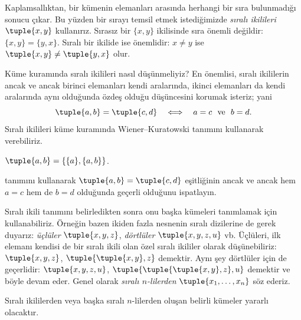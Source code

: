 


\begin{explain}
Kaplamsallıktan, bir kümenin elemanları arasında herhangi bir sıra bulunmadığı
sonucu çıkar. Bu yüzden bir sırayı temsil etmek istediğimizde \emph{sıralı
ikilileri} $\tuple{x, y}$ kullanırız. Sırasız bir $\{x, y\}$ ikilisinde sıra
önemli değildir: $\{x, y\} = \{y, x\}$. Sıralı bir ikilide ise önemlidir:
$x \neq y$ ise $\tuple{x, y} \neq \tuple{y, x}$ olur.

Küme kuramında sıralı ikilileri nasıl düşünmeliyiz? En önemlisi, sıralı
ikililerin ancak ve ancak birinci elemanları kendi aralarında, ikinci
elemanları da kendi aralarında aynı olduğunda özdeş olduğu düşüncesini korumak
isteriz; yani
\[
  \tuple{a, b}= \tuple{c, d}\quad\Longleftrightarrow\quad
  a = c\ \text{ ve }\ b=d.
\]
Sıralı ikilileri küme kuramında Wiener--Kuratowski tanımını kullanarak
verebiliriz.
\end{explain}

\begin{defn}
	$\tuple{a, b} = \{\{a\}, \{a, b\}\}$.
\end{defn}

\begin{prob}
	 tanımını kullanarak
	$\tuple{a, b}= \tuple{c, d}$ eşitliğinin ancak ve ancak hem $a = c$ hem de
	$b=d$ olduğunda geçerli olduğunu ispatlayın.
\end{prob}

\begin{explain}
Sıralı ikili tanımını belirledikten sonra onu başka kümeleri tanımlamak için
kullanabiliriz. Örneğin bazen ikiden fazla nesnenin sıralı dizilerine de gerek
duyarız: \emph{üçlüler} $\tuple{x, y, z}$, \emph{dörtlüler}
$\tuple{x, y, z, u}$ vb. Üçlüleri, ilk elemanı kendisi de bir sıralı ikili
olan özel sıralı ikililer olarak düşünebiliriz: $\tuple{x, y, z}$,
$\tuple{\tuple{x, y},z}$ demektir. Aynı şey dörtlüler için de geçerlidir:
$\tuple{x,y,z,u}$, $\tuple{\tuple{\tuple{x,y},z},u}$ demektir ve böyle devam
eder. Genel olarak \emph{sıralı $n$-lilerden}
$\tuple{x_1, \dots, x_n}$ söz ederiz.

Sıralı ikililerden veya başka sıralı $n$-lilerden oluşan belirli kümeler
yararlı olacaktır.
\end{explain}

